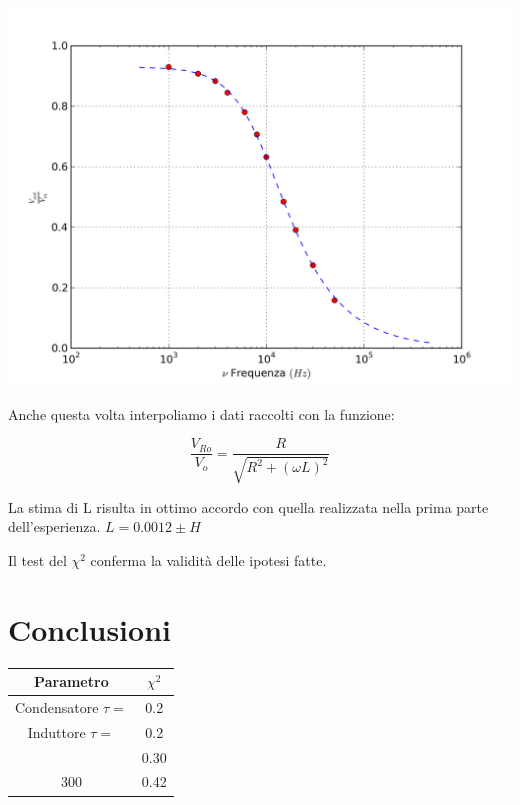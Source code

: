 \begin{center}
 \includegraphics[scale=0.70]{grafici/C3/ddpindu.png}
\end{center}

Anche questa volta interpoliamo i dati raccolti con la funzione:

$$\frac{V_{Ro}}{V_o} = \frac{R}{\sqrt{R^2+(\omega L)^2}}$$

La stima di L risulta in ottimo accordo con quella realizzata nella prima parte dell'esperienza.
$L=0.0012 \pm H $

Il test del $\chi^2$ conferma la validità delle ipotesi fatte.


\section{Conclusioni}


\begin{center}
\begin{tabular}{*{2}{c}}
Parametro & $\chi^2$ \\
\midrule
Condensatore $\tau =$ & 0.2 \\
Induttore $\tau =$ & 0.2 \\
 & 0.30 \\
300 & 0.42 \\

\end{tabular}
\end{center}

